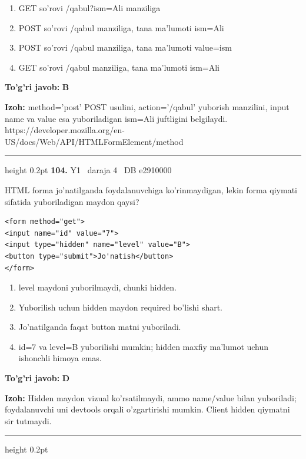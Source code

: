 \documentclass[10pt,a4paper,oneside]{article}
\begin{document}
\begin{enumerate}[label=\Alph*),leftmargin=9mm]
\item GET so'rovi /qabul?ism=Ali manziliga
\item POST so'rovi /qabul manziliga, tana ma'lumoti ism=Ali
\item POST so'rovi /qabul manziliga, tana ma'lumoti value=ism
\item GET so'rovi /qabul manziliga, tana ma'lumoti ism=Ali
\end{enumerate}
\begin{tcolorbox}[enhanced,breakable,colback=teal!4,colframe=teal!45!black,boxrule=0.45pt,arc=1.2mm,left=2.8mm,right=2.8mm,top=2mm,bottom=2mm,before skip=2mm,after skip=2mm]
\textbf{\color{teal}To'g'ri javob:} \textbf{B}
\par\smallskip
\textbf{Izoh:} method='post' POST usulini, action='/qabul' yuborish manzilini, input name va value esa yuboriladigan ism=Ali juftligini belgilaydi. https://developer.mozilla.org/en-US/docs/Web/API/HTMLFormElement/method
\end{tcolorbox}
\vspace{2mm}\hrule height 0.2pt \vspace{4mm}
\hypertarget{q104}{\textbf{\color{ink}104.}}  {\color{muted}\scriptsize Y1 \textbullet\ daraja 4 \textbullet\ DB e2910000}
\par
HTML forma jo'natilganda foydalanuvchiga ko'rinmaydigan, lekin forma qiymati sifatida yuboriladigan maydon qaysi?\par
\begin{lstlisting}
<form method="get">
<input name="id" value="7">
<input type="hidden" name="level" value="B">
<button type="submit">Jo'natish</button>
</form>
\end{lstlisting}

\begin{enumerate}[label=\Alph*),leftmargin=9mm]
\item level maydoni yuborilmaydi, chunki hidden.
\item Yuborilish uchun hidden maydon required bo'lishi shart.
\item Jo'natilganda faqat button matni yuboriladi.
\item id=7 va level=B yuborilishi mumkin; hidden maxfiy ma'lumot uchun ishonchli himoya emas.
\end{enumerate}
\begin{tcolorbox}[enhanced,breakable,colback=teal!4,colframe=teal!45!black,boxrule=0.45pt,arc=1.2mm,left=2.8mm,right=2.8mm,top=2mm,bottom=2mm,before skip=2mm,after skip=2mm]
\textbf{\color{teal}To'g'ri javob:} \textbf{D}
\par\smallskip
\textbf{Izoh:} Hidden maydon vizual ko'rsatilmaydi, ammo name/value bilan yuboriladi; foydalanuvchi uni devtools orqali o'zgartirishi mumkin. Client hidden qiymatni sir tutmaydi.
\end{tcolorbox}
\vspace{2mm}\hrule height 0.2pt \vspace{4mm}
\end{document}

